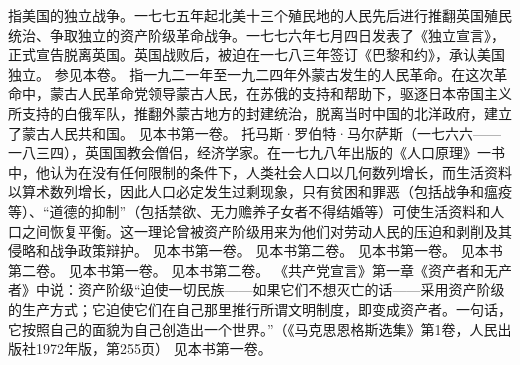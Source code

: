 \begin{maonote}
指美国的独立战争。一七七五年起北美十三个殖民地的人民先后进行推翻英国殖民统治、争取独立的资产阶级革命战争。一七七六年七月四日发表了《独立宣言》，正式宣告脱离英国。英国战败后，被迫在一七八三年签订《巴黎和约》，承认美国独立。
参见本卷。
指一九二一年至一九二四年外蒙古发生的人民革命。在这次革命中，蒙古人民革命党领导蒙古人民，在苏俄的支持和帮助下，驱逐日本帝国主义所支持的白俄军队，推翻外蒙古地方的封建统治，脱离当时中国的北洋政府，建立了蒙古人民共和国。
见本书第一卷。
托马斯·罗伯特·马尔萨斯（一七六六——一八三四），英国国教会僧侣，经济学家。在一七九八年出版的《人口原理》一书中，他认为在没有任何限制的条件下，人类社会人口以几何数列增长，而生活资料以算术数列增长，因此人口必定发生过剩现象，只有贫困和罪恶（包括战争和瘟疫等）、“道德的抑制”（包括禁欲、无力赡养子女者不得结婚等）可使生活资料和人口之间恢复平衡。这一理论曾被资产阶级用来为他们对劳动人民的压迫和剥削及其侵略和战争政策辩护。
见本书第一卷。
见本书第二卷。
见本书第一卷。
见本书第二卷。
见本书第一卷。
见本书第二卷。
《共产党宣言》第一章《资产者和无产者》中说：资产阶级“迫使一切民族——如果它们不想灭亡的话——采用资产阶级的生产方式；它迫使它们在自己那里推行所谓文明制度，即变成资产者。一句话，它按照自己的面貌为自己创造出一个世界。”（《马克思恩格斯选集》第1卷，人民出版社1972年版，第255页）
见本书第一卷。
\end{maonote}
